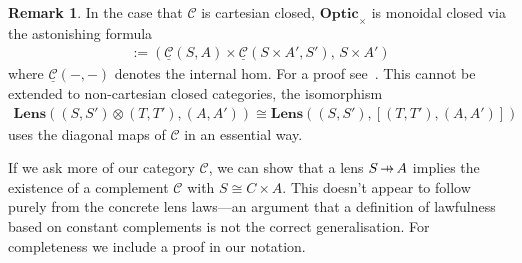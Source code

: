 \documentclass[11pt,letterpaper]{article}
\theoremstyle{plain}
\theoremstyle{definition}
\newtheorem{remark}[theorem]{Remark}
\newcommand{\C}{\mathscr{C}}
\newcommand{\homC}{\underline{\C}}
\newcommand{\Optic}{\mathbf{Optic}}
\newcommand{\Lens}{\mathbf{Lens}}
\newcommand{\hto}{\ensuremath{\,\mathaccent\shortmid\rightarrow\,}}
\begin{document}
\begin{remark}
  In the case that $\C$ is cartesian closed, $\Optic_\times$ is monoidal closed via the astonishing formula
  \begin{align*}
    [(S, S'), (A, A')] := (\homC(S, A) \times \homC(S \times A', S'), \, S \times A')
  \end{align*}
  where $\homC(-, -)$ denotes the internal hom. For a proof see~\cite[Section 1.2]{DialecticaCategories}. This cannot be extended to non-cartesian closed categories, the isomorphism
  \begin{align*}
    \Lens((S, S') \otimes (T, T'), (A, A')) \cong \Lens((S, S'),  [(T, T'), (A, A')])
  \end{align*}
  uses the diagonal maps of $\C$ in an essential way.
\end{remark}

If we ask more of our category $\C$, we can show that a lens $S \hto A$ implies the existence of a complement $\C$ with $S \cong C \times A$.  This doesn't appear to follow purely from the concrete lens laws---an argument that a definition of lawfulness based on constant complements is not the correct generalisation. For completeness we include a proof in our notation.
\end{document}
